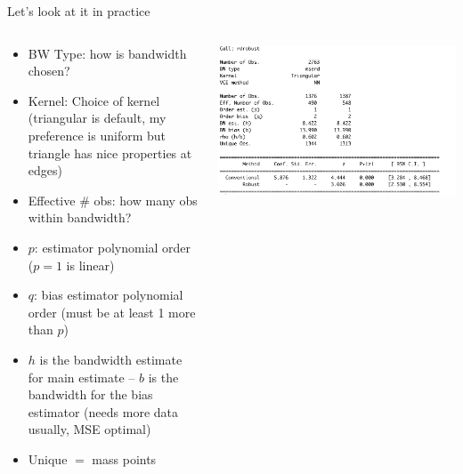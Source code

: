 \documentclass[notes,11pt, aspectratio=169]{beamer}
\begin{document}
\begin{frame}{Let's look at it in practice}
    \begin{columns}[onlytextwidth, T] %
      \begin{column}{.6\textwidth}
        \begin{itemize}
        \item BW Type: how is bandwidth chosen? 
        \item Kernel: Choice of kernel (triangular is default, my
          preference is uniform but triangle has nice properties at edges)
        \item Effective \# obs: how many obs within bandwidth?
        \item $p$: estimator polynomial order ($p=1$ is linear)
        \item $q$: bias estimator polynomial order (must be at least 1 more than $p$)
        \item $h$ is the bandwidth estimate for main estimate -- $b$
          is the bandwidth for the bias estimator (needs more data usually, MSE optimal)
        \item Unique $=$ mass points
        \end{itemize}
      \end{column}%
      \hfill%
      \begin{column}{.4\textwidth}
        \includegraphics[width=\linewidth]{images/rdrobust_1.png}
      \end{column}%
    \end{columns}
\end{frame}
\end{document}
